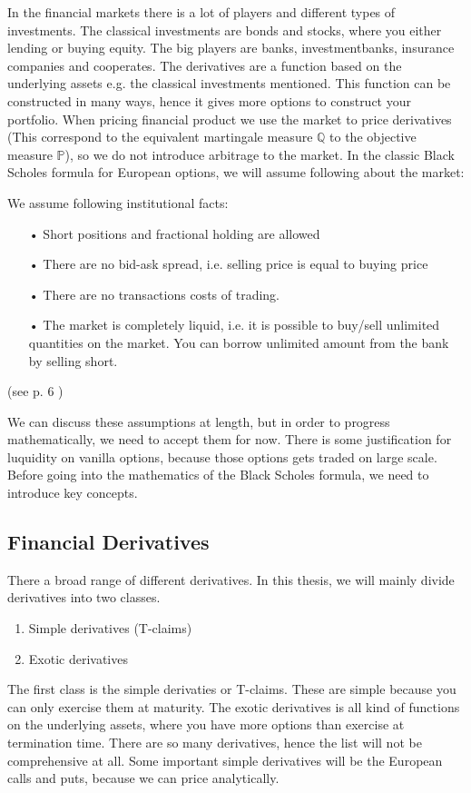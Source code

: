 In the financial markets there is a lot of players and different types of investments. The classical investments are bonds and stocks, where you either lending or buying equity. The big players are banks, investmentbanks, insurance companies and cooperates. The derivatives are a function based on the underlying assets e.g. the classical investments mentioned. This function can be constructed in many ways, hence it gives more options to construct your portfolio. When pricing financial product we use the market to price derivatives (This correspond to the equivalent martingale measure $\mathbb{Q}$ to the objective measure $\mathbb{P}$), so we do not introduce arbitrage to the market. In the classic Black Scholes formula for European options, we will assume following about the market:
\theoremstyle{assumption}
\begin{assumption}{}\label{EfficientMarket}
We assume following institutional facts:
\begin{enumerate}
\item[•] Short positions and fractional holding are allowed 
\item[•] There are no bid-ask spread, i.e. selling price is equal to buying price
\item[•] There are no transactions costs of trading.
\item[•] The market is completely liquid, i.e. it is possible to buy/sell unlimited quantities on the market. You can borrow unlimited amount from the bank by selling short.
\end{enumerate}
(see p. 6 \parencite{finKont})
\end{assumption}
We can discuss these assumptions at length, but in order to progress mathematically, we need to accept them for now. There is some justification for luquidity on vanilla options, because those options gets traded on large scale. Before going into the mathematics of the Black Scholes formula, we need to introduce key concepts.

\subsection{Financial Derivatives}
There a broad range of different derivatives. In this thesis, we will mainly divide derivatives into two classes. 
\begin{enumerate}
\item Simple derivatives (T-claims)
\item Exotic derivatives
\end{enumerate}
The first class is the simple derivaties or T-claims. These are simple because you can only exercise them at maturity. The exotic derivatives is all kind of functions on the underlying assets, where you have more options than exercise at termination time. There are so many derivatives, hence the list will not be comprehensive at all. Some important simple derivatives will be the European calls and puts, because we can price analytically.


